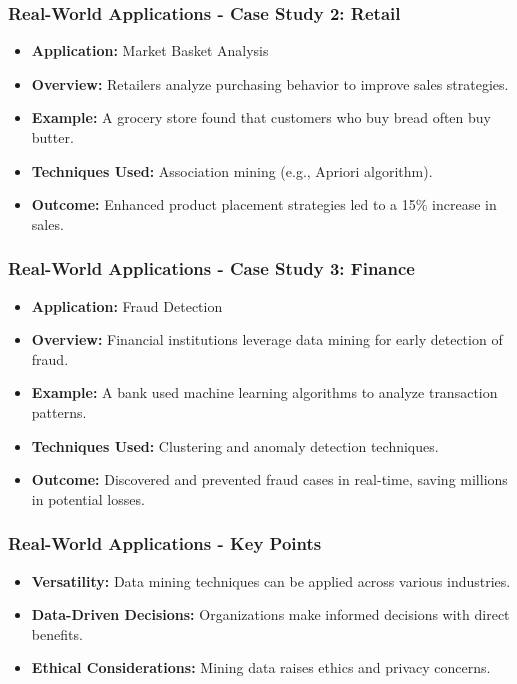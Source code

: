\documentclass{beamer}
\begin{document}
\begin{frame}[fragile]
    \frametitle{Real-World Applications - Case Study 2: Retail}
    \begin{itemize}
        \item \textbf{Application:} Market Basket Analysis
        \item \textbf{Overview:} Retailers analyze purchasing behavior to improve sales strategies.
        \item \textbf{Example:} A grocery store found that customers who buy bread often buy butter.
        \item \textbf{Techniques Used:} Association mining (e.g., Apriori algorithm).
        \item \textbf{Outcome:} Enhanced product placement strategies led to a 15\% increase in sales.
    \end{itemize}
\end{frame}

\begin{frame}[fragile]
    \frametitle{Real-World Applications - Case Study 3: Finance}
    \begin{itemize}
        \item \textbf{Application:} Fraud Detection
        \item \textbf{Overview:} Financial institutions leverage data mining for early detection of fraud.
        \item \textbf{Example:} A bank used machine learning algorithms to analyze transaction patterns.
        \item \textbf{Techniques Used:} Clustering and anomaly detection techniques.
        \item \textbf{Outcome:} Discovered and prevented fraud cases in real-time, saving millions in potential losses.
    \end{itemize}
\end{frame}

\begin{frame}[fragile]
    \frametitle{Real-World Applications - Key Points}
    \begin{itemize}
        \item \textbf{Versatility:} Data mining techniques can be applied across various industries.
        \item \textbf{Data-Driven Decisions:} Organizations make informed decisions with direct benefits.
        \item \textbf{Ethical Considerations:} Mining data raises ethics and privacy concerns.
    \end{itemize}
\end{frame}
\end{document}
